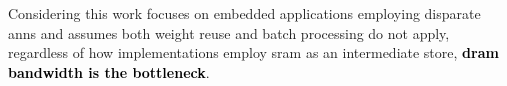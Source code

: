 Considering this work focuses on embedded applications employing disparate \ac{ann}s and assumes both weight reuse and batch processing do not apply, regardless of how implementations employ \ac{sram} as an intermediate store, \textbf{\textcolor{black}{\ac{dram} bandwidth is the bottleneck}}.



\iffalse How this work addresses the problem are outlined in section \ref{chap-five}. \fi

